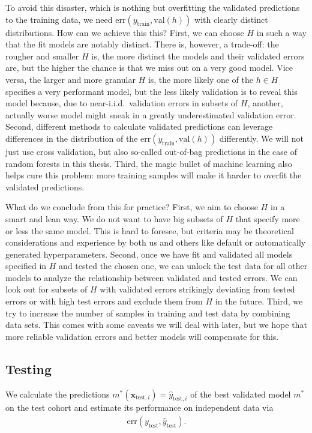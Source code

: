 To avoid this disaster, which is nothing but overfitting the validated predictions to the training 
data, we need $\text{err}(y_\text{train}, \text{val}(h))$ with clearly distinct distributions. 
How can we achieve this this? First, we can choose $H$ in such a way that the fit models are 
notably distinct. There is, however, a trade-off: the rougher and smaller $H$ is, the more distinct 
the models and their validated errors are, but the higher the chance is that we miss out on a very good 
model. Vice versa, the larger and more granular $H$ is, the more likely one of the $h \in H$ 
specifies a very performant model, but the less likely validation is to reveal this model because,
due to near-i.i.d.\ validation errors in subsets of $H$, another, actually worse model might sneak 
in a greatly underestimated validation error. Second, different methods to calculate validated
predictions can leverage differences in the distribution of the 
$\text{err}(y_\text{train}, \text{val}(h))$ differently. We will not just use cross validation, but 
also so-called out-of-bag predictions in the case of random forests in this thesis. Third, the 
magic bullet of machine learning also helps cure this problem: more training samples will make it 
harder to overfit the validated predictions.

What do we conclude from this for practice? First, we aim to choose $H$ in a smart and lean way. 
We do not want to have big subsets of $H$ that specify more or less the same model. This is hard 
to foresee, but criteria may be theoretical considerations and experience by both us and others 
like default or automatically generated hyperparameters. Second, once we have fit and validated 
all models specified in $H$ and tested the chosen one, we can unlock the test data for all other 
models to analyze the relationship between validated and tested errors. We can look out for subsets 
of $H$ with validated errors strikingly deviating from tested errors or with high test errors and 
exclude them from $H$ in the future. Third, we try to increase the number of samples in training 
and test data by combining data sets. This comes with some caveats we will deal with later, but 
we hope that more reliable validation errors and better models will compensate for this.

\subsection{Testing}

We calculate the predictions $m^*(\mathbf{x}_{\text{test}, i}) = \hat{y}_{\text{test}, i}$ of the 
best validated model $m^*$ on the test cohort and estimate its performance on independent data via 
\begin{align}
    \text{err}(y_\text{test}, \hat{y}_\text{test}).
\end{align}

